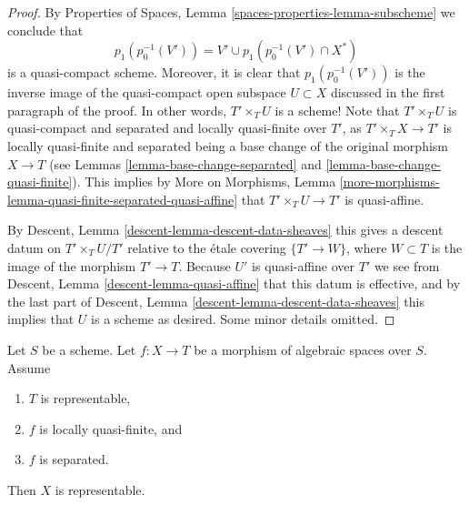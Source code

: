 \begin{proof}
\medskip\noindent
By
Properties of Spaces, Lemma \ref{spaces-properties-lemma-subscheme}
we conclude that
$$
p_1(p_0^{-1}(V')) =
V' \cup p_1(p_0^{-1}(V') \cap X^*)
$$
is a quasi-compact scheme. Moreover, it is clear that
$p_1(p_0^{-1}(V'))$ is the inverse image of the
quasi-compact open subspace $U \subset X$ discussed in the
first paragraph of the proof. In other words, $T' \times_T U$ is a scheme!
Note that $T' \times_T U$ is quasi-compact and
separated and locally quasi-finite over $T'$, as
$T' \times_T X \to T'$ is locally quasi-finite and separated
being a base change of the original morphism $X \to T$ (see
Lemmas \ref{lemma-base-change-separated} and
\ref{lemma-base-change-quasi-finite}).
This implies by
More on Morphisms,
Lemma \ref{more-morphisms-lemma-quasi-finite-separated-quasi-affine}
that $T' \times_T U \to T'$ is quasi-affine.

\medskip\noindent
By
Descent, Lemma \ref{descent-lemma-descent-data-sheaves}
this gives a descent datum on $T' \times_T U / T'$
relative to the \'etale covering $\{T' \to W\}$, where $W \subset T$
is the image of the morphism $T' \to T$.
Because $U'$ is quasi-affine over $T'$ we see from
Descent, Lemma \ref{descent-lemma-quasi-affine}
that this datum is effective, and by the last part of
Descent, Lemma \ref{descent-lemma-descent-data-sheaves}
this implies that $U$ is a scheme as desired.
Some minor details omitted.
\end{proof}

\begin{proposition}
\label{proposition-locally-quasi-finite-separated-over-scheme}
Let $S$ be a scheme.
Let $f : X \to T$ be a morphism of algebraic spaces over $S$.
Assume
\begin{enumerate}
\item $T$ is representable,
\item $f$ is locally quasi-finite, and
\item $f$ is separated.
\end{enumerate}
Then $X$ is representable.
\end{proposition}

